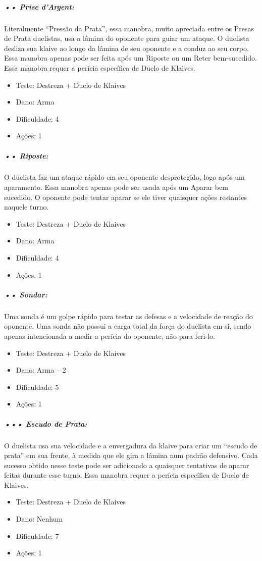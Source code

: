 \subparagraph{\bf •• Prise d'Argent:}
Literalmente “Pressão da Prata”, essa manobra, muito apreciada entre os Presas de Prata duelistas, usa a lâmina do oponente para guiar um ataque. O duelista desliza sua klaive ao longo da lâmina de seu oponente e a conduz ao seu corpo. Essa manobra apenas pode ser feita após um Riposte ou um Reter bem-sucedido. Essa manobra requer a perícia específica de Duelo de Klaives.
\begin{itemize}[noitemsep]
\item Teste: Destreza + Duelo de Klaives
\item Dano: Arma
\item Dificuldade: 4 
\item Ações: 1
\end{itemize}

\subparagraph{\bf •• Riposte:}
O duelista faz um ataque rápido em seu oponente desprotegido, logo após um aparamento. Essa manobra apenas pode ser usada após um Aparar bem sucedido. O oponente pode tentar aparar se ele tiver quaisquer ações restantes naquele turno.
\begin{itemize}[noitemsep]
\item Teste: Destreza + Duelo de Klaives
\item Dano: Arma
\item Dificuldade: 4 
\item Ações: 1
\end{itemize}

\subparagraph{\bf •• Sondar:}
Uma sonda é um golpe rápido para testar as defesas e a velocidade de reação do oponente. Uma sonda não possui a carga total da força do duelista em si, sendo apenas intencionada a medir a perícia do oponente, não para feri-lo. 
\begin{itemize}[noitemsep]
\item Teste: Destreza + Duelo de Klaives
\item Dano: Arma – 2
\item Dificuldade: 5 
\item Ações: 1
\end{itemize}

\subparagraph{\bf ••• Escudo de Prata:}
O duelista usa sua velocidade e a envergadura da klaive para criar um “escudo de prata” em sua frente, à medida que ele gira a lâmina num padrão defensivo. Cada sucesso obtido nesse teste pode ser adicionado a quaisquer tentativas de aparar feitas durante esse turno. Essa manobra requer a perícia específica de Duelo de Klaives.
\begin{itemize}[noitemsep]
\item Teste: Destreza + Duelo de Klaives
\item Dano: Nenhum
\item Dificuldade: 7 
\item Ações: 1
\end{itemize}

